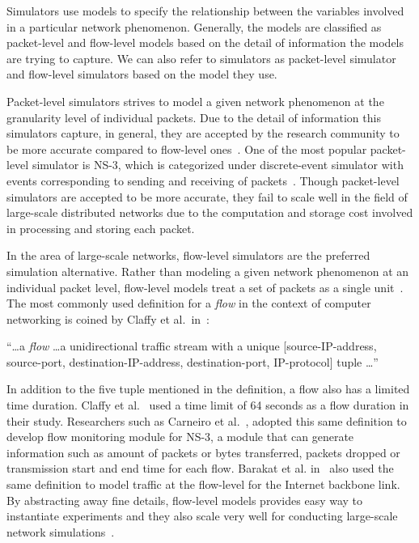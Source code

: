 Simulators use models to specify the relationship between the variables involved in a particular network phenomenon. Generally, the models are classified as packet-level and flow-level models based on the detail of information the models are trying to capture. We can also refer to simulators as packet-level simulator and flow-level simulators based on the model they use. 

Packet-level simulators strives to model a given network phenomenon at the granularity level of individual packets\cite{DBLP:conf/infocom/LiuFGKT01}. Due to the detail of information this simulators capture, in general, they are accepted by the research community to be more accurate compared to flow-level ones~\cite{DBLP:journals/jpdc/CasanovaGLQS14}. One of the most popular packet-level simulator is NS-3, which is categorized under discrete-event simulator with events corresponding to sending and receiving of packets~\cite{ns3}. Though packet-level simulators are accepted to be more accurate, they fail to scale well in the field of large-scale distributed networks due to the computation and storage cost involved in processing and storing each packet. 

In the area of large-scale networks, flow-level simulators are the preferred simulation alternative. Rather than modeling a given network phenomenon at an individual packet level, flow-level models treat a set of packets as a single unit~\cite{DBLP:journals/jpdc/CasanovaGLQS14,DBLP:conf/infocom/LiuFGKT01}. The most commonly used definition for a \emph{flow} in the context of computer networking is coined by Claffy et al.~in~\cite{claffy1998nature}: 

``\ldots a \emph{flow} \ldots a unidirectional traffic stream with a unique [source-IP-address, source-port, destination-IP-address, destination-port, IP-protocol] tuple \ldots''

In addition to the five tuple mentioned in the definition, a flow also has a limited time duration. Claffy et al.~\cite{claffy1998nature} used a time limit of 64 seconds as a flow duration in their study. Researchers such as Carneiro et al.~\cite{DBLP:conf/valuetools/CarneiroFR09}, adopted this same definition to develop flow monitoring module for NS-3, a module that can generate information such as amount of packets or bytes transferred, packets dropped or transmission start and end time for each flow. Barakat et al. in~\cite{DBLP:journals/tsp/BarakatTIDO03} also used the same definition to model traffic at the flow-level for the Internet backbone link. By abstracting away fine details, flow-level models provides easy way to instantiate experiments and they also scale very well for conducting large-scale network simulations~\cite{DBLP:journals/jpdc/CasanovaGLQS14,DBLP:journals/tsp/BarakatTIDO03}.

